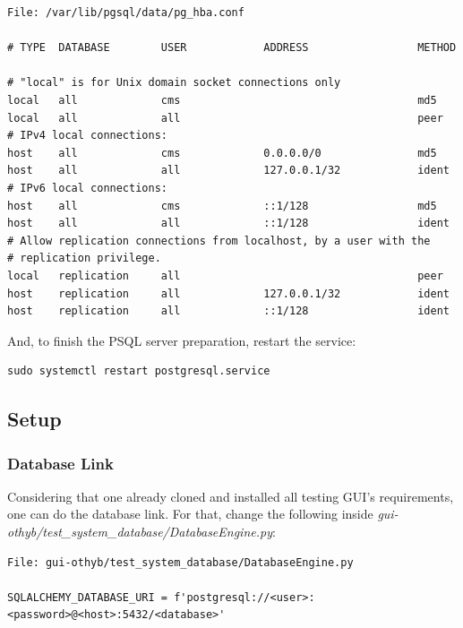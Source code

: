 \documentclass[10pt,a4paper]{article}
\begin{document}
\begin{framed}
\begin{verbatim}
File: /var/lib/pgsql/data/pg_hba.conf

# TYPE  DATABASE        USER            ADDRESS                 METHOD

# "local" is for Unix domain socket connections only
local   all             cms                                     md5
local   all             all                                     peer
# IPv4 local connections:
host    all             cms             0.0.0.0/0               md5
host    all             all             127.0.0.1/32            ident
# IPv6 local connections:
host    all             cms             ::1/128                 md5
host    all             all             ::1/128                 ident
# Allow replication connections from localhost, by a user with the
# replication privilege.
local   replication     all                                     peer
host    replication     all             127.0.0.1/32            ident
host    replication     all             ::1/128                 ident
\end{verbatim}
\end{framed}

And, to finish the PSQL server preparation, restart the service: 

\begin{framed}
\begin{verbatim}
sudo systemctl restart postgresql.service
\end{verbatim}
\end{framed}

\subsection{Setup}

\subsubsection{Database Link}

Considering that one already cloned and installed all testing GUI's requirements, one can do the database link. For that, change the following inside \emph{gui-othyb/test\_system\_database/DatabaseEngine.py}:

\begin{framed}
\begin{verbatim}
File: gui-othyb/test_system_database/DatabaseEngine.py

SQLALCHEMY_DATABASE_URI = f'postgresql://<user>:<password>@<host>:5432/<database>'
\end{verbatim}
\end{framed}
\end{document}
